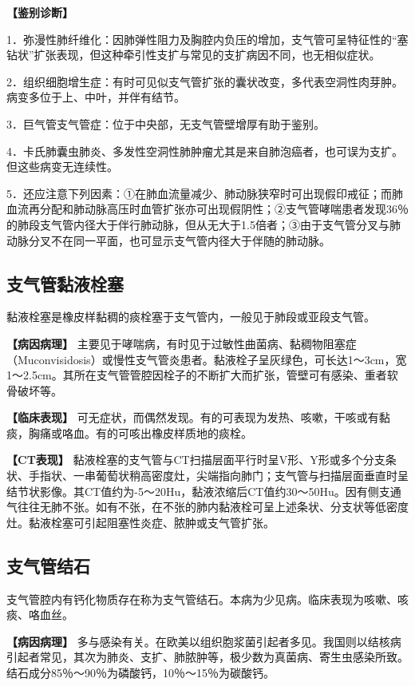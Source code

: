 \textbf{【鉴别诊断】}

1．弥漫性肺纤维化：因肺弹性阻力及胸腔内负压的增加，支气管可呈特征性的“塞钻状”扩张表现，但这种牵引性支扩与常见的支扩病因不同，也无相似症状。

2．组织细胞增生症：有时可见似支气管扩张的囊状改变，多代表空洞性肉芽肿。病变多位于上、中叶，并伴有结节。

3．巨气管支气管症：位于中央部，无支气管壁增厚有助于鉴别。

4．卡氏肺囊虫肺炎、多发性空洞性肺肿瘤尤其是来自肺泡癌者，也可误为支扩。但这些病变无连续性。

5．还应注意下列因素：①在肺血流量减少、肺动脉狭窄时可出现假印戒征；而肺血流再分配和肺动脉高压时血管扩张亦可出现假阴性；②支气管哮喘患者发现36％的肺段支气管内径大于伴行肺动脉，但从无大于1.5倍者；③由于支气管分叉与肺动脉分叉不在同一平面，也可显示支气管内径大于伴随的肺动脉。

\subsection{支气管黏液栓塞}

黏液栓塞是橡皮样黏稠的痰栓塞于支气管内，一般见于肺段或亚段支气管。

\textbf{【病因病理】}
主要见于哮喘病，有时见于过敏性曲菌病、黏稠物阻塞症（Muconvisidosis）或慢性支气管炎患者。黏液栓子呈灰绿色，可长达1～3cm，宽1～2.5cm。其所在支气管管腔因栓子的不断扩大而扩张，管壁可有感染、重者软骨破坏等。

\textbf{【临床表现】}
可无症状，而偶然发现。有的可表现为发热、咳嗽，干咳或有黏痰，胸痛或咯血。有的可咳出橡皮样质地的痰栓。

\textbf{【CT表现】}
黏液栓塞的支气管与CT扫描层面平行时呈V形、Y形或多个分支条状、手指状、一串葡萄状稍高密度灶，尖端指向肺门；支气管与扫描层面垂直时呈结节状影像。其CT值约为-5～20Hu，黏液浓缩后CT值约30～50Hu。因有侧支通气往往无肺不张。如有不张，在不张的肺内黏液栓可呈上述条状、分支状等低密度灶。黏液栓塞可引起阻塞性炎症、脓肿或支气管扩张。

\subsection{支气管结石}

支气管腔内有钙化物质存在称为支气管结石。本病为少见病。临床表现为咳嗽、咳痰、咯血丝。

\textbf{【病因病理】}
多与感染有关。在欧美以组织胞浆菌引起者多见。我国则以结核病引起者常见，其次为肺炎、支扩、肺脓肿等，极少数为真菌病、寄生虫感染所致。结石成分85％～90％为磷酸钙，10％～15％为碳酸钙。

